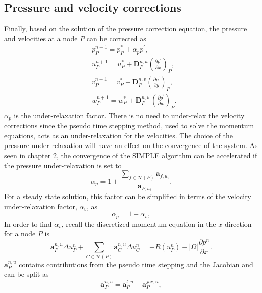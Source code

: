 \subsection{Pressure and velocity corrections}
Finally, based on the solution of the pressure correction equation, the pressure and velocities at a node $P$ can be corrected as
\begin{align}
&p_{P}^{n+1}=p_{P}^{\ast}+\alpha_{p}p^{\prime}, \label{eq:pcorrfinal}\\
&u_{P}^{n+1}=u_{P}^{\ast}+\boldsymbol{D}_{P}^{n,u}\left(\frac{\partial p^{\prime}}{\partial x}\right)_{P}, \nonumber\\
&v_{P}^{n+1}=v_{P}^{\ast}+\boldsymbol{D}_{P}^{n,v}\left(\frac{\partial p^{\prime}}{\partial y}\right)_{P},\label{eq:velcorrfinal}\\
&w_{P}^{n+1}=w_{P}^{\ast}+\boldsymbol{D}_{P}^{n,w}\left(\frac{\partial p^{\prime}}{\partial w}\right)_{P}\nonumber.
\end{align} 
$\alpha_p$ is the under-relaxation factor. There is no need to under-relax the velocity corrections since the pseudo time stepping method, used to solve the  momentum equations, acts as an under-relaxation for the velocities. The choice of the pressure under-relaxation will have an effect on the convergence of the system. 
As seen in chapter 2, the convergence of the SIMPLE algorithm can be accelerated if the pressure under-relaxation is set to
\begin{equation}
\alpha_p = 1+\frac{\sum_{f \in\mathcal{N}(P)} \mathbf{a}_{f,u_i}}{\mathbf{a}_{P,u_i}}.
\end{equation}
For a steady state solution, this factor can be simplified in terms of the velocity under-relaxation factor, $\alpha_v$, as
\begin{equation}
\alpha_p = 1 - \alpha_v,
\end{equation}
In order to find $\alpha_v$, recall the discretized momentum equation in the $x$ direction for a node $P$ is
\begin{equation*}
\mathbf{a}_{P}^{n,u}\Delta u_{P}^n+\sum_{C \in \mathcal{N}(P)} \mathbf{a}_{C}^{n,u}\Delta u_{C}^n=-R(u_{P}^{n})-|\Omega|\frac{\partial p^n}{\partial x}.
\end{equation*}
$\mathbf{a}_{P}^{n,u}$ contains contributions from the pseudo time stepping and the Jacobian and can be split as
\begin{equation}
\mathbf{a}_{P}^{n,u} = \boldsymbol{a}_{P}^{t,n} + \boldsymbol{a}_{P}^{jac,n},
\label{eq:urstart1}
\end{equation}
